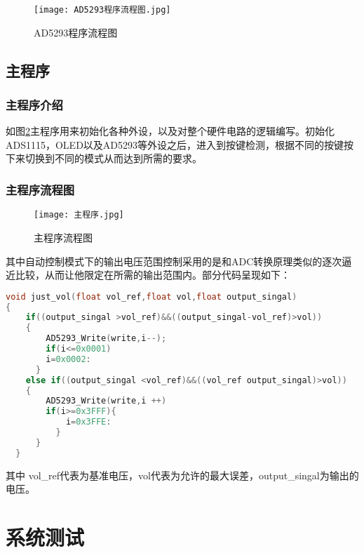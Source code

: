 \documentclass[lang=cn,11pt,a4paper]{elegantpaper}
\begin{document}
\begin{figure}[!htb]
  \centering
  \texttt{[image: AD5293程序流程图.jpg]}
  \caption{AD5293程序流程图}
  \label{fig:AD5293程序流程图}
\end{figure}

\subsection{主程序}
\subsubsection{主程序介绍}
如图\ref{fig:主程序流程图}主程序用来初始化各种外设，以及对整个硬件电路的逻辑编写。初始化ADS1115，OLED以及AD5293等外设之后，进入到按键检测，根据不同的按键按下来切换到不同的模式从而达到所需的要求。

\subsubsection{主程序流程图}
\begin{figure}[!htb]
  \centering
  \texttt{[image: 主程序.jpg]}
  \caption{主程序流程图}
  \label{fig:主程序流程图}
\end{figure}

其中自动控制模式下的输出电压范围控制采用的是和ADC转换原理类似的逐次逼近比较，从而让他限定在所需的输出范围内。部分代码呈现如下：
\begin{lstlisting}[language=C,caption={主程序部分代码},label={code:zhu}]
void just_vol(float vol_ref,float vol,float output_singal)
{
    if((output_singal >vol_ref)&&((output_singal-vol_ref)>vol))
    {
        AD5293_Write(write,i--);
        if(i<=0x0001)
        i=0x0002:
      }
    else if((output_singal <vol_ref)&&((vol_ref output_singal)>vol))
    {
        AD5293_Write(write,i ++)
        if(i>=0x3FFF){
            i=0x3FFE:
          }
      }
  }
  \end{lstlisting}
其中 vol\_ref代表为基准电压，vol代表为允许的最大误差，output\_singal为输出的电压。

\section{系统测试}
\end{document}
